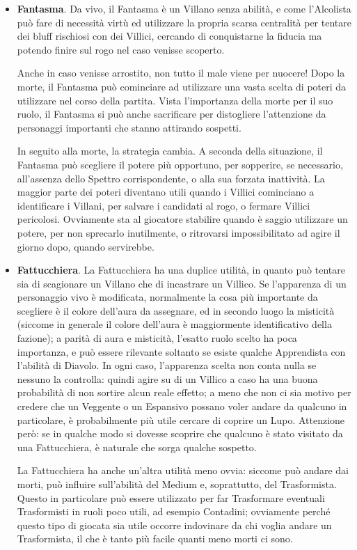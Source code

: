 \documentclass[a4paper,10pt]{article}
\begin{document}
\begin{itemize}
	\item {\bf Fantasma}. Da vivo, il Fantasma è un Villano senza abilità, e come l'Alcolista può fare di necessità virtù ed utilizzare la propria scarsa centralità per tentare dei bluff rischiosi con dei Villici, cercando di conquistarne la fiducia ma potendo finire sul rogo nel caso venisse scoperto.
	
	Anche in caso venisse arrostito, non tutto il male viene per nuocere! Dopo la morte, il Fantasma può cominciare ad utilizzare una vasta scelta di poteri da utilizzare nel corso della partita. Vista l'importanza della morte per il suo ruolo, il Fantasma si può anche sacrificare per distogliere l'attenzione da personaggi importanti che stanno attirando sospetti.
	
	In seguito alla morte, la strategia cambia. A seconda della situazione, il Fantasma può scegliere il potere più opportuno, per sopperire, se necessario, all'assenza dello Spettro corrispondente, o alla sua forzata inattività. La maggior parte dei poteri diventano utili quando i Villici cominciano a identificare i Villani, per salvare i candidati al rogo, o fermare Villici pericolosi. Ovviamente sta al giocatore stabilire quando è saggio utilizzare un potere, per non sprecarlo inutilmente, o ritrovarsi impossibilitato ad agire il giorno dopo, quando servirebbe.
	
	\item {\bf Fattucchiera}. La Fattucchiera ha una duplice utilità, in quanto può tentare sia di scagionare un Villano che di incastrare un Villico. Se l'apparenza di un personaggio vivo è modificata, normalmente la cosa più importante da scegliere è il colore dell'aura da assegnare, ed in secondo luogo la misticità (siccome in generale il colore dell'aura è maggiormente identificativo della fazione); a parità di aura e misticità, l'esatto ruolo scelto ha poca importanza, e può essere rilevante soltanto se esiste qualche Apprendista con l'abilità di Diavolo. In ogni caso, l'apparenza scelta non conta nulla se nessuno la controlla: quindi agire su di un Villico a caso ha una buona probabilità di non sortire alcun reale effetto; a meno che non ci sia motivo per credere che un Veggente o un Espansivo possano voler andare da qualcuno in particolare, è probabilmente più utile cercare di coprire un Lupo. Attenzione però: se in qualche modo si dovesse scoprire che qualcuno è stato visitato da una Fattucchiera, è naturale che sorga qualche sospetto.

    La Fattucchiera ha anche un'altra utilità meno ovvia: siccome può andare dai morti, può influire sull'abilità del Medium e, soprattutto, del Trasformista. Questo in particolare può essere utilizzato per far Trasformare eventuali Trasformisti in ruoli poco utili, ad esempio Contadini; ovviamente perché questo tipo di giocata sia utile occorre indovinare da chi voglia andare un Trasformista, il che è tanto più facile quanti meno morti ci sono.


\end{itemize}
\end{document}
